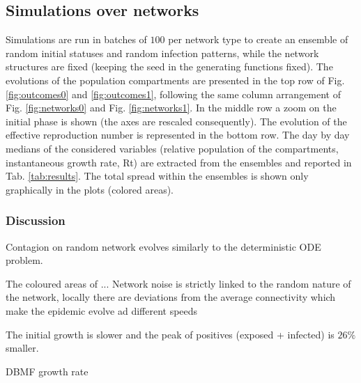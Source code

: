 \documentclass[DIV=12, BCOR=0pt]{scrartcl}  %
\begin{document}
  \subsection{Simulations over networks}
  Simulations are run in batches of $100$ per network type to create an ensemble of random initial statuses and random infection patterns, while the network structures are fixed (keeping the seed in the generating functions fixed). The evolutions of the population compartments are presented in the top row of Fig. \ref{fig:outcomes0} and \ref{fig:outcomes1}, following the same column arrangement of Fig. \ref{fig:networks0} and Fig. \ref{fig:networks1}. In the middle row a zoom on the initial phase is shown (the axes are rescaled consequently). The evolution of the effective reproduction number is represented in the bottom row. The day by day medians of the considered variables (relative population of the compartments, instantaneous growth rate, Rt) are extracted from the ensembles and reported in Tab. \ref{tab:results}. The total spread within the ensembles is shown only graphically in the plots (colored areas).
  
  
  \subsubsection{Discussion}
  Contagion on random network evolves similarly to the deterministic ODE problem. 
  
  The coloured areas of ... Network noise is strictly linked to the random nature of the network, locally there are deviations from the average connectivity which make the epidemic evolve ad different speeds
  
  The initial growth is slower and the peak of positives (exposed + infected) is $26 \%$ smaller.
  
  DBMF growth rate
  
  
  
\end{document}
